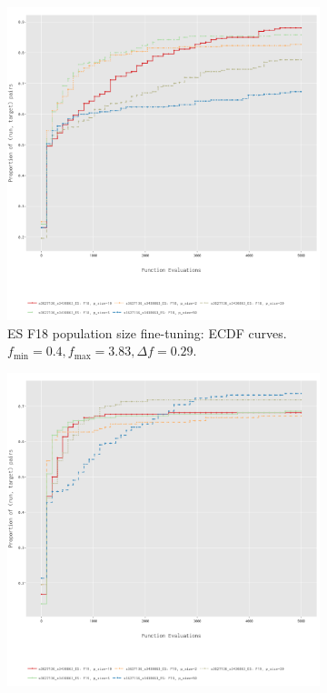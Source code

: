 \documentclass{article}
\begin{document}
\begin{figure}[!ht]
    \begin{subfigure}[h]{0.95\linewidth}
        \includegraphics[width=\linewidth]{es/f18/ECDF18ps.png}
        \caption{ES F18 population size fine-tuning: ECDF curves. $f_{\min} = 0.4, f_{\max} = 3.83, \Delta f = 0.29$.}
    \end{subfigure}
    \hfill
    \begin{subfigure}[h]{0.95\linewidth}
        \includegraphics[width=\linewidth]{es/f19/ECDF19ps.png}

\end{subfigure}
\end{figure}
\end{document}
